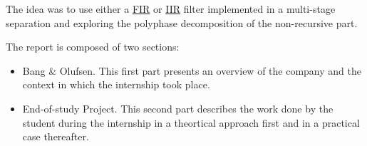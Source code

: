 The idea was to use either a \hyperlink{FIR}{FIR} or \hyperlink{IIR}{IIR} filter implemented in a multi-stage separation and exploring the polyphase decomposition of the non-recursive part. 



The report is composed of two sections:

\begin{itemize}

\item Bang \& Olufsen. This first part presents an overview of the company and the context in which the internship took place.

\item End-of-study Project. This second part describes the work done by the student during the internship in a theortical approach first and in a practical case thereafter.

\end{itemize}